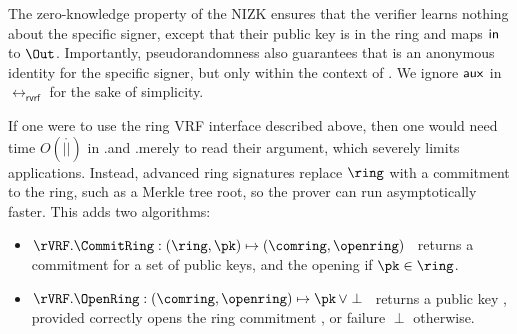 

The zero-knowledge property of the NIZK ensures that the verifier learns nothing about the specific
signer, except that their public key is in the ring and maps $\mathsf{in}$ to $\Out$.
Importantly, pseudorandomness also guarantees that \Out is an anonymous identity
for the specific signer, but only within the context of \msg.  We ignore $ \mathsf{aux} $ in $ \rel_{\mathsf{rvrf}} $ for the sake of simplicity. 





If one were to use the ring VRF interface described above, then one would need time
$O(|\ring|)$ in \rVRF.\rSign and \rVRF.\rVerify merely to read their \ring
argument, which severely limits applications.
Instead, advanced ring signatures replace $ \ring $ with a commitment to the ring, such as a Merkle tree root, so the prover can run asymptotically faster.
This adds two algorithms: 
\begin{itemize}
\item $\rVRF.\CommitRing : (\ring,\pk) \mapsto (\comring,\openring)$ \,
    returns a commitment for a set \ring of public keys, and
     the opening \openring if $\pk \in \ring$.
\item $\rVRF.\OpenRing : (\comring,\openring) \mapsto \pk \, \lor \perp$ \,
    returns a public key \pk, provided \openring correctly opens
    the ring commitment \comring, or failure $\perp$ otherwise.
\end{itemize}


